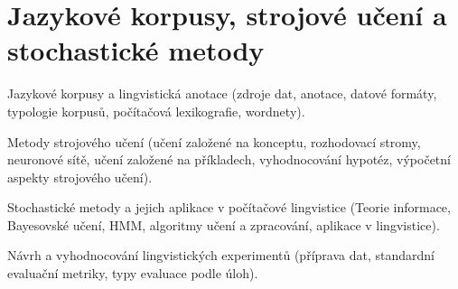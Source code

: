 \newpage
\section{Jazykové korpusy, strojové učení a stochastické metody}
\begin{pozadavky}
\begin{pitemize}
\item Jazykové korpusy a lingvistická anotace (zdroje dat, anotace, datové formáty, typologie korpusů, počítačová lexikografie, wordnety).
\item Metody strojového učení (učení založené na konceptu, rozhodovací stromy, neuronové sítě, učení založené na příkladech, vyhodnocování hypotéz, výpočetní aspekty strojového učení).
\item Stochastické metody a jejich aplikace v počítačové lingvistice (Teorie informace, Bayesovské učení, HMM, algoritmy učení a zpracování, aplikace v lingvistice).
\item Návrh a vyhodnocování lingvistických experimentů (příprava dat, standardní evaluační metriky, typy evaluace podle úloh).
\end{pitemize}
\end{pozadavky}